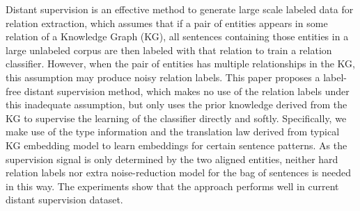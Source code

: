 Distant supervision is an effective method to generate large scale labeled data for relation extraction, which assumes that if a pair of entities appears in some relation of a Knowledge Graph (KG), all sentences containing those entities in a large unlabeled corpus are then labeled with that relation to train a relation classifier.  However, when the pair of entities has multiple relationships in the KG, this assumption may produce noisy relation labels.  This paper proposes a label-free distant supervision method, which makes no use of the relation labels under this inadequate assumption, but only uses the prior knowledge derived from the KG to supervise the learning of the classifier directly and softly. Specifically, we make use of the type information and the translation law derived from typical KG embedding model to learn embeddings for certain sentence patterns. As the supervision signal is only determined by the two aligned entities, neither hard relation labels nor extra noise-reduction model for the bag of sentences is needed in this way. The experiments show that the approach performs well in current distant supervision dataset.

